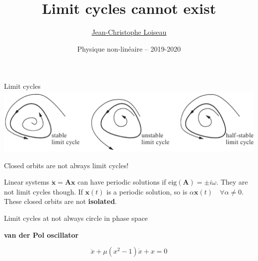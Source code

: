 \documentclass[usenames,dvipsnames,svgnames,10pt,aspectratio=169]{beamer}
\title[Nonlinear physics] %
{
	Limit cycles cannot exist
}
\author[J.-Ch.~Loiseau] %
{
	\underline{Jean-Christophe Loiseau}
}
\institute[unused]
{
	\url{jean-christophe.loiseau@ensam.eu} \\
	Laboratoire DynFluid \\
	Arts et M\'etiers, France.
}
\date[unused]{Physique non-lin\'eaire -- 2019-2020}
\begin{document}
\titleframe	%


\begin{frame}[t, c]{Limit cycles}{}
  \centering
  \includegraphics[width=.8\textwidth]{limit_cycles}
  \vspace{1cm}
\end{frame}

\begin{frame}[t, c]{Closed orbits are not always limit cycles!}{}
  \begin{minipage}{.6\textwidth}
    Linear systems $\dot{\bm{x}} = \bm{Ax}$ can have periodic solutions if $\textrm{eig}(\bm{A}) = \pm i \omega$.
    They are not limit cycles though.
    If $\bm{x}(t)$ is a periodic solution, so is $\alpha \bm{x}(t) \quad \forall \alpha \neq 0$.
    These closed orbits are not \alert{\textbf{isolated}}.
  \end{minipage}%
  \hfill
  \begin{minipage}{.36\textwidth}
    \centering
  \end{minipage}
\end{frame}

\begin{frame}[t, c]{Limit cycles at not always circle in phase space}{}
  \begin{minipage}{.48\textwidth}
    \centering
    \textbf{van der Pol oscillator}

    \[
    \ddot{x} + \mu \left( x^2 - 1 \right) \dot{x} + x = 0
    \]
  \end{minipage}%
  \hfill
  \begin{minipage}{.48\textwidth}
    \centering
  \end{minipage}
\end{frame}
\end{document}
